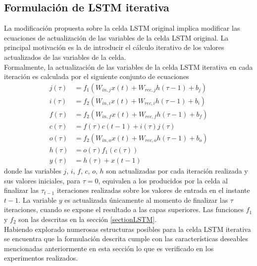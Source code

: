 \documentclass{article}
\begin{document}
	\subsection{Formulación de LSTM iterativa}
	La modificación propuesta sobre la celda LSTM original implica modificar las ecuaciones de actualización de las variables de la celda LSTM original. La principal motivación es la de introducir el cálculo iterativo de los valores actualizados de las variables de la celda.\\
	Formalmente, la actualización de las variables de la celda LSTM iterativa en cada iteración es calculada por el siguiente conjunto de ecuaciones 
	\begin{equation}\label{iterativeLSTMformulation}
	\begin{split}
	j(\tau) &= f_1(W_{in, j} x(t) + W_{rec, j} h(\tau-1) + b_j)\\
	i(\tau) &= f_2(W_{in, i} x(t) + W_{rec, i} h(\tau-1) + b_i)\\
	f(\tau) &= f_2(W_{in, f} x(t) + W_{rec, f} h(\tau-1) + b_f)\\
	c(\tau) &= f(\tau)c(t-1) + i(\tau)j(\tau)\\
	o(\tau) &= f_2(W_{in, o} x(t) + W_{rec, o} h(\tau-1) + b_o)\\
	h(\tau) &= o(\tau)f_1(c(\tau))\\
	y(\tau) &= h(\tau) + x(t-1)
	\end{split}
	\end{equation}
	donde las variables $j$, $i$, $f$, $c$, $o$, $h$ son actualizadas por cada iteración realizada y sus valores iniciales, para $\tau=0$, equivalen a los producidos por la celda al finalizar las $\tau_{t-1}$ iteraciones realizadas sobre los valores de entrada en el instante $t-1$. La variable $y$ es actualizada únicamente al momento de finalizar las $\tau$ iteraciones, cuando se expone el resultado a las capas superiores. Las funciones $f_1$ y $f_2$ son las descritas en la sección \ref{sectionLSTM}.\\
	Habiendo explorado numerosas estructuras posibles para la celda LSTM iterativa se encuentra que la formulación descrita cumple con las características deseables mencionadas anteriormente en esta sección lo que es verificado en los experimentos realizados.\\
	
\end{document}
